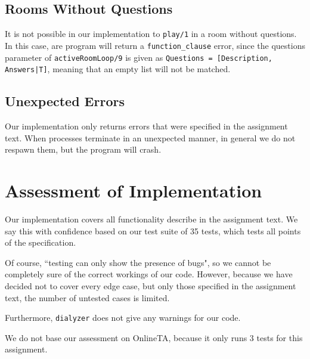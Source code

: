 \documentclass{article}
\begin{document}
\subsection{Rooms Without Questions}
It is not possible in our implementation to \texttt{play/1} in a room without questions. In this case, are program will return a  \texttt{function\_clause} error, since the questions parameter of \texttt{activeRoomLoop/9} is given as \texttt{Questions = [{Description, Answers}|T]}, meaning that an empty list will not be matched.

\subsection{Unexpected Errors}
Our implementation only returns errors that were specified in the assignment text. When processes terminate in an unexpected manner, in general we do not respawn them, but the program will crash.

\section{Assessment of Implementation}
Our implementation covers all functionality describe in the assignment text. We say this with confidence based on our test suite of 35 tests, which tests all points of the specification.

Of course, ``testing can only show the presence of bugs", so we cannot be completely sure of the correct workings of our code. However, because we have decided not to cover every edge case, but only those specified in the assignment text, the number of untested cases is limited.

Furthermore, \texttt{dialyzer} does not give any warnings for our code.

We do not base our assessment on OnlineTA, because it only runs 3 tests for this assignment.
\end{document}
